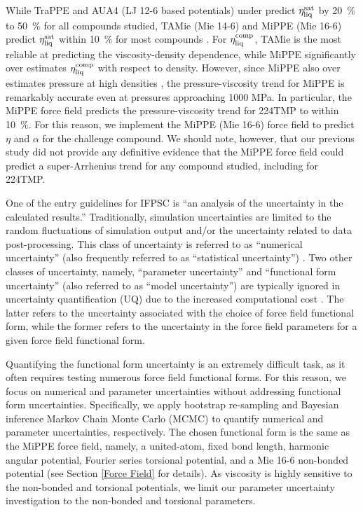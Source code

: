 \documentclass[preprint,review,12pt]{elsarticle}
\begin{document}
	While TraPPE and AUA4 (LJ 12-6 based potentials) under predict $\eta_{\rm liq}^{\rm sat}$ by 20~\% to 50~\% for all compounds studied, TAMie (Mie 14-6) and MiPPE (Mie 16-6) predict $\eta_{\rm liq}^{\rm sat}$ within 10~\% for most compounds \cite{Postdoc_3}. For $\eta_{\rm liq}^{\rm comp}$, TAMie is the most reliable at predicting the viscosity-density dependence, while MiPPE significantly over estimates $\eta_{\rm liq}^{\rm comp}$ with respect to density. However, since MiPPE also over estimates pressure at high densities \cite{Postdoc_2}, the pressure-viscosity trend for MiPPE is remarkably accurate even at pressures approaching 1000 MPa. In particular, the MiPPE force field predicts the pressure-viscosity trend for 224TMP to within 10~\%. For this reason, we implement the MiPPE (Mie 16-6) force field to predict $\eta$ and $\alpha$ for the challenge compound. We should note, however, that our previous study did not provide any definitive evidence that the MiPPE force field could predict a super-Arrhenius trend for any compound studied, including for 224TMP.
	 
	One of the entry guidelines for IFPSC is ``an analysis of the uncertainty in the calculated results.'' Traditionally, simulation uncertainties are limited to the random fluctuations of simulation output and/or the uncertainty related to data post-processing. This class of uncertainty is referred to as ``numerical uncertainty'' (also frequently referred to as ``statistical uncertainty'') \cite{Bay_Deriv,Bay_MD,Bay_UQ,Mess4}. Two other classes of uncertainty, namely, ``parameter uncertainty'' and ``functional form uncertainty'' (also referred to as ``model uncertainty'') are typically ignored in uncertainty quantification (UQ) due to the increased computational cost \cite{Bay_Deriv,Bay_MD,Bay_UQ,Mess4}. The latter refers to the uncertainty associated with the choice of force field functional form, while the former refers to the uncertainty in the force field parameters for a given force field functional form.
	
	
	Quantifying the functional form uncertainty is an extremely difficult task, as it often requires testing numerous force field functional forms. For this reason, we focus on numerical and parameter uncertainties without addressing functional form uncertainties. Specifically, we apply bootstrap re-sampling \cite{Efron1979} and Bayesian inference Markov Chain Monte Carlo (MCMC) \cite{Postdoc_2,Bay_Deriv,Bay_MD,Bay_UQ} to quantify numerical and parameter uncertainties, respectively. The chosen functional form is the same as the MiPPE force field, namely, a united-atom, fixed bond length, harmonic angular potential, Fourier series torsional potential, and a Mie 16-6 non-bonded potential (see Section \ref{Force Field} for details). As viscosity is highly sensitive to the non-bonded \cite{Postdoc_3,Gordon2006} and torsional \cite{Nieto2006,Braga2012} potentials, we limit our parameter uncertainty investigation to the non-bonded and torsional parameters. 
	
\end{document}
